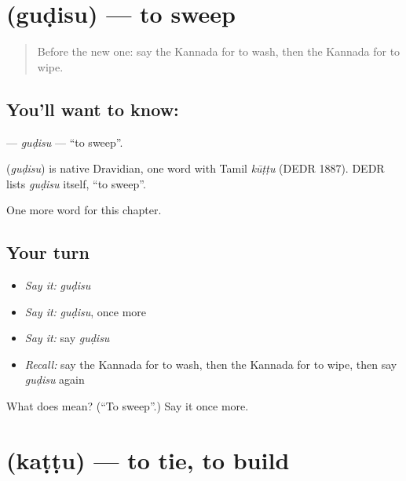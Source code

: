 \section[\texorpdfstring{\kn{ಗುಡಿಸು} (guḍisu)}{ಗುಡಿಸು (guḍisu)}]{ (guḍisu) — to sweep}

\label{lesson:KA-C150-gudisu}



\begin{quote}
Before the new one: say the Kannada for to wash, then the Kannada for to wipe.
\end{quote}

\subsection*{You'll want to know: }
\textbf{} — \emph{guḍisu} — \textquotedblleft{}to sweep\textquotedblright{}.

\begin{cousinweb}
\textbf{} (\emph{guḍisu}) is native Dravidian, one word with Tamil \emph{kūṭṭu} (DEDR 1887). DEDR lists \emph{guḍisu} itself, \textquotedblleft{}to sweep\textquotedblright{}.
\end{cousinweb}

\begin{grammarlens}[title={What you've built}]
One more word for this chapter.
\end{grammarlens}

\subsection*{Your turn}
\begin{itemize}
\raggedright
  \item \emph{Say it:} \emph{guḍisu}
  \item \emph{Say it:} \emph{guḍisu}, once more
  \item \emph{Say it:} say \emph{guḍisu}
  \item \emph{Recall:} say the Kannada for to wash, then the Kannada for to wipe, then say \emph{guḍisu} again
\end{itemize}

\begin{tcolorbox}[breakable,colback=teal!4,colframe=teal!35!black,title={Before you move on}]
What does  mean? (\textquotedblleft{}To sweep\textquotedblright{}.) Say it once more.
\end{tcolorbox}
\section[\texorpdfstring{\kn{ಕಟ್ಟು} (kaṭṭu)}{ಕಟ್ಟು (kaṭṭu)}]{ (kaṭṭu) — to tie, to build}

